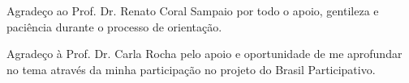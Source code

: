 \begin{agradecimentos}
Agradeço ao Prof. Dr. Renato Coral Sampaio por todo o apoio, gentileza e paciência durante o processo de orientação.

Agradeço à Prof. Dr. Carla Rocha pelo apoio e oportunidade de me aprofundar no tema através da minha participação no projeto do Brasil Participativo.

\end{agradecimentos}
